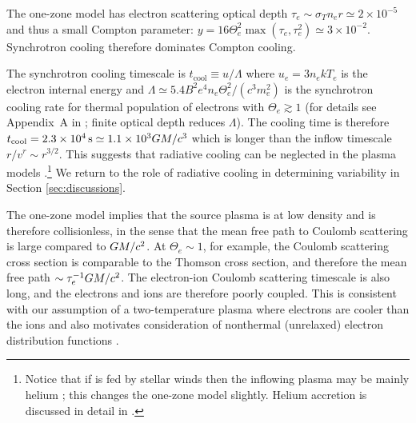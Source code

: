 The one-zone model has electron scattering optical depth  $\tau_e \sim \sigma_T n_e r \simeq 2\times10^{-5}$ and thus a small Compton parameter: $y = 16 \Theta_e^2 \max(\tau_e,\tau_e^2) \simeq 3\times10^{-2}$.
Synchrotron cooling therefore dominates Compton cooling.

The synchrotron cooling timescale is $t_\mathrm{cool} \equiv u/\Lambda$ where $u_e = 3 n_e k T_e$ is the electron internal energy and $\Lambda \simeq 5.4 B^2 e^4 n_e \Theta_e^2 /(c^3 m_e^2)$ is the synchrotron cooling rate for thermal population of electrons with $\Theta_e \gtrsim 1$ (for details see Appendix~A in \citealt{2011ApJ...735....9M}; finite optical depth reduces $\Lambda$).
The cooling time is therefore $t_\mathrm{cool}=2.3 \times 10^4\,\mathrm{s} \simeq 1.1 \times 10^3 GM/c^3$ which is longer than the inflow timescale $r/v^r \sim r^{3/2}$.  This suggests that radiative cooling can be neglected in the plasma models \citep[more detailed calculations confirm this estimate][]{2012MNRAS.426.1928D,2020MNRAS.499.3178Y}.\footnote{Notice that if \sgra is fed by stellar winds then the inflowing plasma may be mainly helium \citep{2019MNRAS.482L.123R}; this changes the one-zone model slightly. Helium accretion is discussed in detail in \citep{Wong_2022}.}  We return to the role of radiative cooling in determining variability in Section \ref{sec:discussions}.

The one-zone model implies that the source plasma is at low density and is therefore collisionless, in the sense that the mean free path to Coulomb scattering is large compared to $GM/c^2$.
At $\Theta_e \sim 1$, for example, the Coulomb scattering cross section is comparable to the Thomson cross section, and therefore the mean free path $\sim \tau_e^{-1} GM/c^2$.
The electron-ion Coulomb scattering timescale is also long, and the electrons and ions are therefore poorly coupled.
This is consistent with our assumption of a two-temperature  plasma where electrons are cooler than the ions \citep{1976ApJ...204..187S,1977ApJ...214..840I, 1982Natur.295...17R} and also motivates consideration of
nonthermal (unrelaxed) electron distribution functions \citep[see][]{2000ApJ...541..234O, 2009ApJ...701..521C, 2014A&A...570A...7M, 2018A&A...612A..34D, 2021arXiv211102518F, 2021NatAs.tmp..218C, Chatterjee2021, 2021arXiv211203933E, Scepi2021}.

